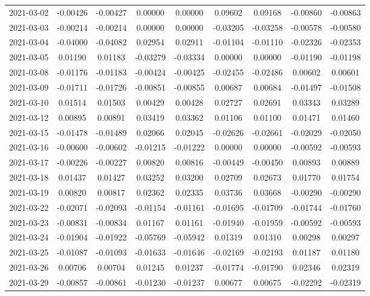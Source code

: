 {\begin{footnotesize}
\begin{longtable}{lcccccccc}
2021-03-02 & -0.00426 & -0.00427 & 0.00000 & 0.00000 & 0.09602 & 0.09168 & -0.00860 & -0.00863 \\
2021-03-03 & -0.00214 & -0.00214 & 0.00000 & 0.00000 & -0.03205 & -0.03258 & -0.00578 & -0.00580 \\
2021-03-04 & -0.04000 & -0.04082 & 0.02954 & 0.02911 & -0.01104 & -0.01110 & -0.02326 & -0.02353 \\
2021-03-05 & 0.01190 & 0.01183 & -0.03279 & -0.03334 & 0.00000 & 0.00000 & -0.01190 & -0.01198 \\
2021-03-08 & -0.01176 & -0.01183 & -0.00424 & -0.00425 & -0.02455 & -0.02486 & 0.00602 & 0.00601 \\
2021-03-09 & -0.01711 & -0.01726 & -0.00851 & -0.00855 & 0.00687 & 0.00684 & -0.01497 & -0.01508 \\
2021-03-10 & 0.01514 & 0.01503 & 0.00429 & 0.00428 & 0.02727 & 0.02691 & 0.03343 & 0.03289 \\
2021-03-12 & 0.00895 & 0.00891 & 0.03419 & 0.03362 & 0.01106 & 0.01100 & 0.01471 & 0.01460 \\
2021-03-15 & -0.01478 & -0.01489 & 0.02066 & 0.02045 & -0.02626 & -0.02661 & -0.02029 & -0.02050 \\
2021-03-16 & -0.00600 & -0.00602 & -0.01215 & -0.01222 & 0.00000 & 0.00000 & -0.00592 & -0.00593 \\
2021-03-17 & -0.00226 & -0.00227 & 0.00820 & 0.00816 & -0.00449 & -0.00450 & 0.00893 & 0.00889 \\
2021-03-18 & 0.01437 & 0.01427 & 0.03252 & 0.03200 & 0.02709 & 0.02673 & 0.01770 & 0.01754 \\
2021-03-19 & 0.00820 & 0.00817 & 0.02362 & 0.02335 & 0.03736 & 0.03668 & -0.00290 & -0.00290 \\
2021-03-22 & -0.02071 & -0.02093 & -0.01154 & -0.01161 & -0.01695 & -0.01709 & -0.01744 & -0.01760 \\
2021-03-23 & -0.00831 & -0.00834 & 0.01167 & 0.01161 & -0.01940 & -0.01959 & -0.00592 & -0.00593 \\
2021-03-24 & -0.01904 & -0.01922 & -0.05769 & -0.05942 & 0.01319 & 0.01310 & 0.00298 & 0.00297 \\
2021-03-25 & -0.01087 & -0.01093 & -0.01633 & -0.01646 & -0.02169 & -0.02193 & 0.01187 & 0.01180 \\
2021-03-26 & 0.00706 & 0.00704 & 0.01245 & 0.01237 & -0.01774 & -0.01790 & 0.02346 & 0.02319 \\
2021-03-29 & -0.00857 & -0.00861 & -0.01230 & -0.01237 & 0.00677 & 0.00675 & -0.02292 & -0.02319 \\

\end{longtable}
\end{footnotesize}}
